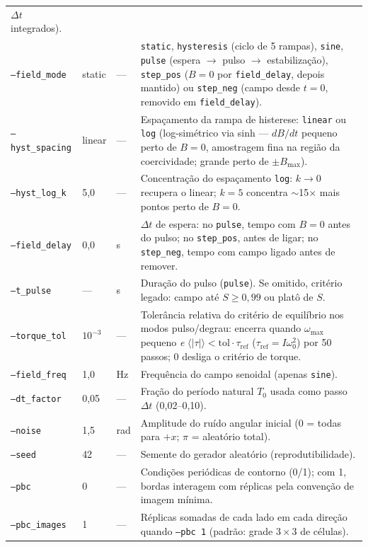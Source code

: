 \documentclass[11pt,a4paper]{article}
\newcommand{\code}[1]{\texttt{#1}}
\begin{document}
\begin{longtable}{@{}lll p{7.6cm}@{}}
$\Delta t$ integrados). \\
\code{--field\_mode} & static & --- & \code{static},
\code{hysteresis} (ciclo de 5 rampas), \code{sine}, \code{pulse}
(espera $\to$ pulso $\to$ estabilização), \code{step\_pos} ($B{=}0$ por
\code{field\_delay}, depois mantido) ou \code{step\_neg} (campo desde
$t{=}0$, removido em \code{field\_delay}). \\
\code{--hyst\_spacing} & linear & --- & Espaçamento da rampa de
histerese: \code{linear} ou \code{log} (log-simétrico via sinh ---
$dB/dt$ pequeno perto de $B{=}0$, amostragem fina na região da
coercividade; grande perto de $\pm B_{\max}$). \\
\code{--hyst\_log\_k} & 5{,}0 & --- & Concentração do espaçamento
\code{log}: $k \to 0$ recupera o linear; $k{=}5$ concentra
$\sim$15$\times$ mais pontos perto de $B{=}0$. \\
\code{--field\_delay} & 0{,}0 & s & $\Delta t$ de espera: no
\code{pulse}, tempo com $B{=}0$ antes do pulso; no \code{step\_pos},
antes de ligar; no \code{step\_neg}, tempo com campo ligado antes de
remover. \\
\code{--t\_pulse} & --- & s & Duração do pulso (\code{pulse}). Se
omitido, critério legado: campo até $S \geq 0{,}99$ ou platô de $S$. \\
\code{--torque\_tol} & $10^{-3}$ & --- & Tolerância relativa do critério
de equilíbrio nos modos pulso/degrau: encerra quando $\omega_{\max}$
pequeno \emph{e} $\langle|\tau|\rangle < \mathrm{tol}\cdot\tau_{\mathrm{ref}}$
($\tau_{\mathrm{ref}} = I\omega_0^2$) por 50 passos; 0 desliga o
critério de torque. \\
\code{--field\_freq} & 1{,}0 & Hz & Frequência do campo senoidal
(apenas \code{sine}). \\
\code{--dt\_factor} & 0{,}05 & --- & Fração do período natural $T_0$
usada como passo $\Delta t$ (0{,}02--0{,}10). \\
\code{--noise} & 1{,}5 & rad & Amplitude do ruído angular inicial
($0$ = todas para $+x$; $\pi$ = aleatório total). \\
\code{--seed} & 42 & --- & Semente do gerador aleatório
(reprodutibilidade). \\
\code{--pbc} & 0 & --- & Condições periódicas de contorno (0/1);
com 1, bordas interagem com réplicas pela convenção de imagem mínima. \\
\code{--pbc\_images} & 1 & --- & Réplicas somadas de cada lado em cada
direção quando \code{--pbc 1} (padrão: grade $3\times3$ de células). \\

\end{longtable}
\end{document}
